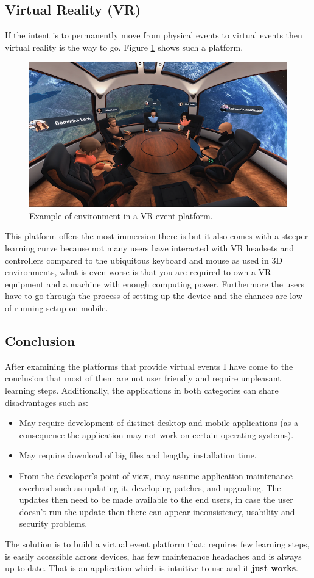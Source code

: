 \subsection*{Virtual Reality (VR)}
If the intent is to permanently move from physical events to virtual events then virtual reality is the way to go. Figure \ref{figure:motivation-vr} shows such a platform.

\begin{figure}[H]
	\includegraphics[width=\textwidth]{images/meetinvr_vr_conference.png}
	\caption{Example of environment in a VR event platform.}
	\label{figure:motivation-vr}
\end{figure}

This platform offers the most immersion there is but it also comes with a steeper learning curve because not many users have interacted with VR headsets and controllers compared to the ubiquitous keyboard and mouse as used in 3D environments, what is even worse is that you are required to own a VR equipment and a machine with enough computing power. Furthermore the users have to go through the process of setting up the device and the chances are low of running setup on mobile. \\

\subsection*{Conclusion}
After examining the platforms that provide virtual events I have come to the conclusion that most of them are not user friendly and require unpleasant learning steps. Additionally, the applications in both categories can share disadvantages such as:
\begin{itemize}
    \item May require development of distinct desktop and mobile applications (as a consequence the application may not work on certain operating systems).
    \item May require download of big files and lengthy installation time.
    \item From the developer's point of view, may assume application maintenance overhead such as updating it, developing patches, and upgrading. The updates then need to be made available to the end users, in case the user doesn't run the update then there can appear inconsistency, usability and security problems.
\end{itemize}

The solution is to build a virtual event platform that: requires few learning steps,	 is easily accessible across devices, has few maintenance headaches and is always up-to-date. That is an application which is intuitive to use and it \textbf{just works}.

